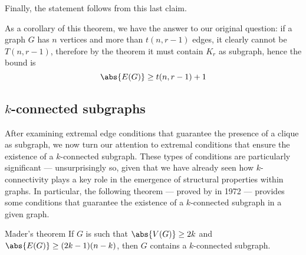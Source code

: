 \documentclass[a4paper, 12pt]{report}
\begin{document}
{        

        Finally, the statement follows from this last claim.
    }

    As a corollary of this theorem, we have the answer to our original question: if a graph $G$ has $n$ vertices and more than $t(n, r - 1)$ edges, it clearly cannot be $T(n, r - 1)$, therefore by the theorem it must contain $K_r$ as subgraph, hence the bound is $$\abs{E(G)} \ge t(n, r - 1) + 1$$

    \subsection{$k$-connected subgraphs}

    After examining extremal edge conditions that guarantee the presence of a clique as subgraph, we now turn our attention to extremal conditions that ensure the existence of a $k$-connected subgraph. These types of conditions are particularly significant --- unsurprisingly so, given that we have already seen how $k$-connectivity plays a key role in the emergence of structural properties within graphs. In particular, the following theorem --- proved by \textcite{mader} in 1972 --- provides some conditions that guarantee the existence of a $k$-connected subgraph in a given graph.

    \begin{framedthm}{Mader's theorem}
        If $G$ is such that $\abs{V(G)} \ge 2k$ and $\abs{E(G)} \ge (2k - 1)(n - k)$, then $G$ contains a $k$-connected subgraph.
    \end{framedthm}
\end{document}
